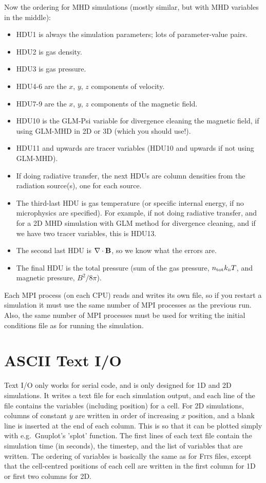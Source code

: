 \documentclass[a4paper,11pt]{report}
\begin{document}
Now the ordering for MHD simulations (mostly similar, but with MHD variables in the middle):
\begin{itemize}
\item HDU1 is always the simulation parameters; lots of parameter-value pairs.
\item HDU2 is gas density.
\item HDU3 is gas pressure.
\item HDU4-6 are the $x$, $y$, $z$ components of velocity.
\item HDU7-9 are the $x$, $y$, $z$ components of the magnetic field. 
\item HDU10 is the GLM-Psi variable for divergence cleaning the magnetic field, if using GLM-MHD in 2D or 3D (which you should use!).
\item HDU11 and upwards are tracer variables (HDU10 and upwards if not using GLM-MHD).
\item If doing radiative transfer, the next HDUs are column densities from the radiation source(s), one for each source.
\item The third-last HDU is gas temperature (or specific internal energy, if no microphysics are specified).
  For example, if not doing radiative transfer, and for a 2D MHD simulation with GLM method for divergence cleaning, and if we have two tracer variables, this is HDU13.
\item The second last HDU is $\mathbf{\nabla}\cdot\mathbf{B}$, so we know what the errors are.
\item The final HDU is the total pressure (sum of the gas pressure, $n_{\mathrm{tot}}k_{\mathrm{\textsc{b}}}T$, and magnetic pressure, $B^2/8\pi$).
\end{itemize}

Each MPI process (on each CPU) reads and writes its own file, so if you restart a simulation it must use the same number of MPI processes as the previous run.
Also, the same number of MPI processes must be used for writing the initial conditions file as for running the simulation.



\section{ASCII Text I/O}
Text I/O only works for serial code, and is only designed for 1D and 2D simulations.
It writes a text file for each simulation output, and each line of the file contains the variables (including position) for a cell.
For 2D simulations, columns of constant $y$ are written in order of increasing $x$ position, and a blank line is inserted at the end of each column.
This is so that it can be plotted simply with e.g.\ Gnuplot's 'splot' function.
The first lines of each text file contain the simulation time (in seconds), the timestep, and the list of variables that are written.
The ordering of variables is basically the same as for \textsc{Fits} files, except that the cell-centred positions of each cell are written in the first column for 1D or first two columns for 2D.
\end{document}
